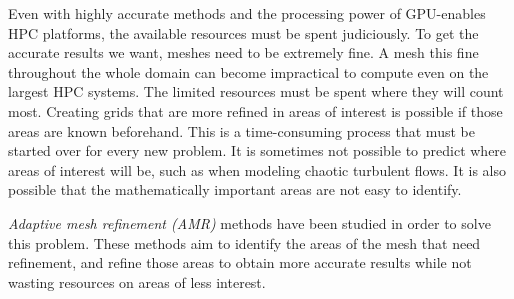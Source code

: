 Even with highly accurate methods and the processing power of GPU-enables HPC platforms, the
available resources must be spent judiciously. To get the accurate results we want, meshes need to
be extremely fine. A mesh this fine throughout the whole domain can become impractical to compute
even on the largest HPC systems. The limited resources must be spent where they will count most.
Creating grids that are more refined in areas of interest is possible if those areas are known
beforehand. This is a time-consuming process that must be started over for every new problem. It is
sometimes not possible to predict where areas of interest will be, such as when modeling chaotic
turbulent flows. It is also possible that the mathematically important areas are not easy to
identify. 

\textit{Adaptive mesh refinement (AMR)} methods have been studied in order to solve this problem.
These methods aim to identify the areas of the mesh that need refinement, and refine those areas to
obtain more accurate results while not wasting resources on areas of less interest.



